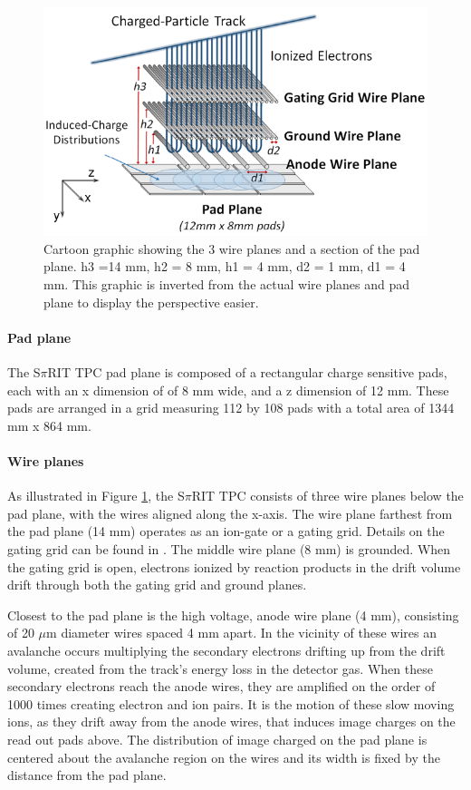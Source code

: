 \documentclass[review]{elsarticle}
\begin{document}
\begin{figure}[H]
\includegraphics[width=\linewidth]{padwire}
\caption{Cartoon graphic showing the 3 wire planes and a section of the pad plane. h3 =14 mm, h2 = 8 mm, h1 = 4 mm, d2 = 1 mm, d1 = 4 mm. This graphic is inverted from the actual wire planes and pad plane to display the perspective easier.}
\label{fig:padwire}
\end{figure}

\paragraph{Pad plane} 
The S$\pi$RIT TPC pad plane is composed of a rectangular charge sensitive pads, each with an x dimension of of 8 mm wide, and a z dimension of 12 mm. These pads are arranged in a grid measuring 112 by 108 pads with a total area of 1344 mm x 864 mm.

\paragraph{Wire planes}
As illustrated in Figure \ref{fig:padwire}, the S$\pi$RIT TPC consists of three wire planes below the pad plane, with the wires aligned along the x-axis. The wire plane farthest from the pad plane (14 mm) operates as an ion-gate or a gating grid. Details on the gating grid can be found in \cite{suwat}. The middle wire plane (8 mm) is grounded. When the gating grid is open, electrons ionized by reaction products in the drift volume drift through both the gating grid and ground planes. 

Closest to the pad plane is the high voltage, anode wire plane (4 mm), consisting of 20 $\mu$m diameter wires spaced 4 mm apart. In the vicinity of these wires an avalanche occurs multiplying the secondary electrons drifting up from the drift volume, created from the track's energy loss in the detector gas. When these secondary electrons reach the anode wires, they are amplified on the order of 1000 times creating electron and ion pairs. It is the motion of these slow moving ions, as they drift away from the anode wires, that induces image charges on the read out pads above. The distribution of image charged on the pad plane is centered about the avalanche region on the wires and its width is fixed by the distance from the pad plane. 
\end{document}
